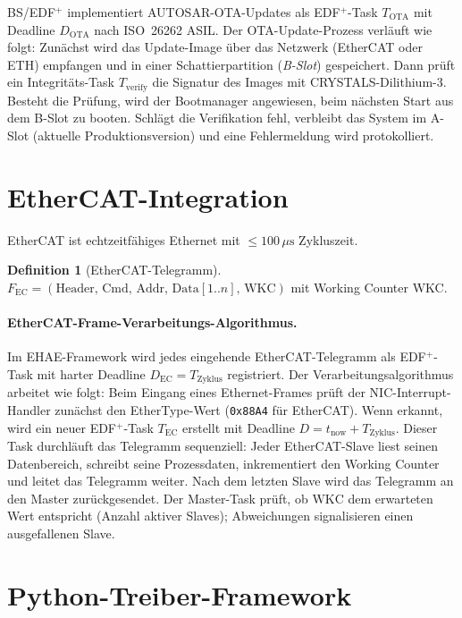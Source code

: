 ﻿\documentclass[a4paper,12pt]{scrreprt}
\theoremstyle{definition}
\newtheorem{definition}{Definition}[chapter]
\begin{document}
	BS/EDF$^+$ implementiert AUTOSAR-OTA-Updates \cite{Epp2026autsre}
	als EDF$^+$-Task $T_{\mathrm{OTA}}$ mit Deadline $D_{\mathrm{OTA}}$
	nach ISO~26262 ASIL. Der OTA-Update-Prozess verläuft wie folgt:
	Zunächst wird das Update-Image über das Netzwerk (EtherCAT oder ETH)
	empfangen und in einer Schattierpartition (\emph{B-Slot}) gespeichert.
	Dann prüft ein Integritäts-Task $T_{\mathrm{verify}}$ die Signatur
	des Images mit CRYSTALS-Dilithium-3. Besteht die Prüfung, wird der
	Bootmanager angewiesen, beim nächsten Start aus dem B-Slot zu booten.
	Schlägt die Verifikation fehl, verbleibt das System im A-Slot (aktuelle
	Produktionsversion) und eine Fehlermeldung wird protokolliert.

	\section{EtherCAT-Integration}

	EtherCAT \cite{IEC61158,Epp2026ethercate} ist echtzeitfähiges
	Ethernet mit $\leq 100\,\mu\text{s}$ Zykluszeit.

	\begin{definition}[EtherCAT-Telegramm]
		$F_{\mathrm{EC}} = (\mathrm{Header},\, \mathrm{Cmd},\, \mathrm{Addr},\,
		\mathrm{Data}[1..n],\, \mathrm{WKC})$ mit Working Counter WKC.
	\end{definition}

	\paragraph{EtherCAT-Frame-Verarbeitungs-Algorithmus.}
	Im EHAE-Framework \cite{Epp2026ethercate} wird jedes eingehende EtherCAT-Telegramm
	als EDF$^+$-Task mit harter Deadline $D_{\mathrm{EC}} = T_{\mathrm{Zyklus}}$
	registriert. Der Verarbeitungsalgorithmus arbeitet wie folgt: Beim Eingang
	eines Ethernet-Frames prüft der NIC-Interrupt-Handler zunächst den
	EtherType-Wert (\texttt{0x88A4} für EtherCAT). Wenn erkannt, wird ein
	neuer EDF$^+$-Task $T_{\mathrm{EC}}$ erstellt mit Deadline
	$D = t_{\mathrm{now}} + T_{\mathrm{Zyklus}}$. Dieser Task durchläuft das
	Telegramm sequenziell: Jeder EtherCAT-Slave liest seinen Datenbereich,
	schreibt seine Prozessdaten, inkrementiert den Working Counter und leitet
	das Telegramm weiter. Nach dem letzten Slave wird das Telegramm an den
	Master zurückgesendet. Der Master-Task prüft, ob $\mathrm{WKC}$ dem
	erwarteten Wert entspricht (Anzahl aktiver Slaves); Abweichungen signalisieren
	einen ausgefallenen Slave.
	
	\section{Python-Treiber-Framework}
	
\end{document}
